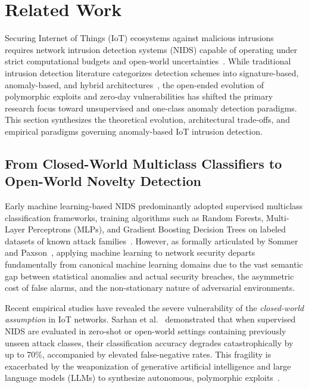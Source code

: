 
\section{Related Work}
\label{sec:related_work}

Securing Internet of Things (IoT) ecosystems against malicious intrusions requires network intrusion detection systems (NIDS) capable of operating under strict computational budgets and open-world uncertainties~\cite{mirsky2018kitsune,samara2022survey}. While traditional intrusion detection literature categorizes detection schemes into signature-based, anomaly-based, and hybrid architectures~\cite{liao2013intrusion,khraisat2019survey}, the open-ended evolution of polymorphic exploits and zero-day vulnerabilities has shifted the primary research focus toward unsupervised and one-class anomaly detection paradigms. This section synthesizes the theoretical evolution, architectural trade-offs, and empirical paradigms governing anomaly-based IoT intrusion detection.

\subsection{From Closed-World Multiclass Classifiers to Open-World Novelty Detection}
\label{subsec:rel_closed_vs_open}

Early machine learning-based NIDS predominantly adopted supervised multiclass classification frameworks, training algorithms such as Random Forests, Multi-Layer Perceptrons (MLPs), and Gradient Boosting Decision Trees on labeled datasets of known attack families~\cite{koroniotis2019towards,phan2024comparison}. However, as formally articulated by Sommer and Paxson~\cite{sommer2010outside}, applying machine learning to network security departs fundamentally from canonical machine learning domains due to the vast semantic gap between statistical anomalies and actual security breaches, the asymmetric cost of false alarms, and the non-stationary nature of adversarial environments. 

Recent empirical studies have revealed the severe vulnerability of the \emph{closed-world assumption} in IoT networks. Sarhan et al.~\cite{sarhan2023zero} demonstrated that when supervised NIDS are evaluated in zero-shot or open-world settings containing previously unseen attack classes, their classification accuracy degrades catastrophically by up to 70\%, accompanied by elevated false-negative rates. This fragility is exacerbated by the weaponization of generative artificial intelligence and large language models (LLMs) to synthesize autonomous, polymorphic exploits~\cite{ferrag2025generative,xu2025autonomous}. 

